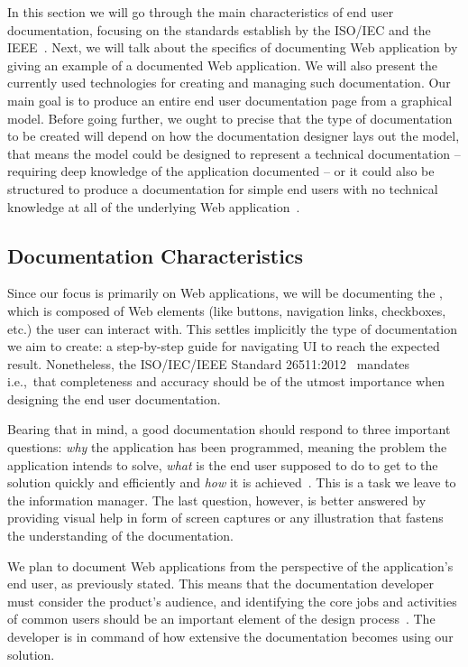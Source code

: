 In this section we will go through the main characteristics of end user documentation, focusing on the standards establish by the ISO/IEC and the IEEE~\cite{ieee5712775, ISO-IEC-IEEE}. Next, we will talk about the specifics of documenting Web application by giving an example of a documented Web application. We will also present the currently used technologies for creating and managing such documentation. Our main goal is to produce an entire end user documentation page from a graphical model. Before going further, we ought to precise that the type of documentation to be created will depend on how the documentation designer lays out the model, that means the model could be designed to represent a technical documentation -- requiring deep knowledge of the application documented -- or it could also be structured to produce a documentation for simple end users with no technical knowledge at all of the underlying Web application~\cite{ieee6081814}.


\subsection{Documentation Characteristics}\label{sec:char}

Since our focus is primarily on Web applications, we will be documenting the , which is composed of Web elements (like buttons, navigation links, checkboxes, etc.) the user can interact with. This settles implicitly the type of documentation we aim to create: a step-by-step guide for navigating UI to reach the expected result. Nonetheless, the ISO/IEC/IEEE Standard 26511:2012~\cite{ieee6170926} mandates i.e.,~that completeness and accuracy should be of the utmost importance when designing the end user documentation.

Bearing that in mind, a good documentation should respond to three important questions: \textit{why} the application has been programmed, meaning the problem the application intends to solve, \textit{what} is the end user supposed to do to get to the solution quickly and efficiently and \textit{how} it is achieved~\cite{ISO-IEC-IEEE}. This is a task we leave to the information manager. The last question, however, is better answered by providing visual help in form of screen captures or any illustration that fastens the understanding of the documentation. 

We plan to document Web applications from the perspective of the application's end user, as previously stated. This means that the documentation developer must consider the product's audience, and identifying the core jobs and activities of common users should be an important element of the design process~\cite{ISO-IEC-IEEE}. The developer is in command of how extensive the documentation becomes using our solution.

